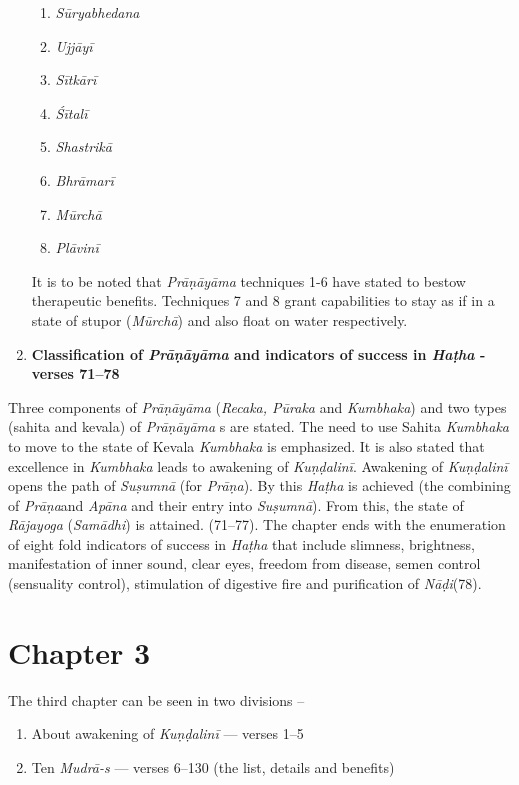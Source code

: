 \begin{enumerate}
\begin{enumerate}
\item \textit{Sūryabhedana}
\item \textit{Ujjāyī}
\item \textit{Sītkārī}
\item \textit{Śītalī}
\item \textit{Shastrikā}
\item \textit{Bhrāmarī}
\item \textit{Mūrchā}
\item \textit{Plāvinī}
\end{enumerate}

It is to be noted that \textit{Prāṇāyāma} techniques 1-6 have stated to bestow therapeutic benefits. Techniques 7 and 8 grant capabilities to stay as if in a state of stupor (\textit{Mūrchā}) and also float on water respectively.

\item \textbf{Classification of \textit{Prāṇāyāma} and indicators of success in \textit{Haṭha} - verses 71--78}
\end{enumerate}

Three components of \textit{Prāṇāyāma} (\textit{Recaka, Pūraka} and \textit{Kumbhaka}) and two types (sahita and kevala) of \textit{Prāṇāyāma} s are stated. The need to use Sahita \textit{Kumbhaka} to move to the state of Kevala \textit{Kumbhaka} is emphasized. It is also stated that excellence in \textit{Kumbhaka} leads to awakening of \textit{Kuṇḍalinī}. Awakening of \textit{Kuṇḍalinī}  opens the path of \textit{Suṣumnā} (for \textit{Prāṇa}). By this \textit{Haṭha} is achieved (the combining of \textit{Prāṇa}and \textit{Apāna} and their entry into \textit{Suṣumnā}).  From this, the state of \textit{Rājayoga} (\textit{Samādhi}) is attained. (71--77). The chapter ends with the  enumeration of eight fold indicators of success in \textit{Haṭha} that include slimness, brightness, manifestation of inner sound, clear eyes, freedom from disease, semen control (sensuality control), stimulation of digestive fire and purification of \textit{Nāḍi}(78). 

\section*{Chapter 3}

The third chapter can be seen in two divisions –

\begin{enumerate}
\item About awakening of \textit{Kuṇḍalinī}  --- verses 1--5
\item Ten \textit{Mudrā-s} --- verses 6--130 (the list, details and benefits)
\end{enumerate}

